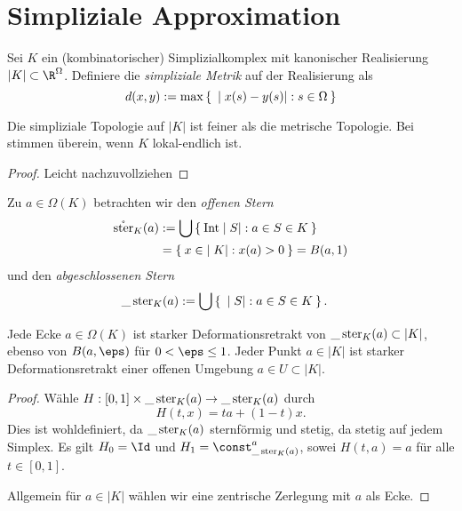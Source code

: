 \section{Simpliziale Approximation}


\begin{df}
	Sei $K$ ein (kombinatorischer) Simplizialkomplex mit kanonischer Realisierung $|K| \subset \R^{\Omega}$.
	Definiere die \emph{simpliziale Metrik} auf der Realisierung als
	\[
		d(x,y) :=
		\max \Set{ |x(s) - y(s)| : s \in \Omega }
	\]
\end{df}

\begin{st}
	Die simpliziale Topologie auf $|K|$ ist feiner als die metrische Topologie.
	Bei stimmen überein, wenn $K$ lokal-endlich ist.
	\begin{proof}
		Leicht nachzuvollziehen
	\end{proof}
\end{st}

\begin{df}
	Zu $a \in \Omega(K)$ betrachten wir den \emph{offenen Stern}
	\begin{align*}
		\mathring {\operatorname{ster}}_K(a)
		&:= \bigcup \Set{  \operatorname{Int} |S| : a \in S \in K } \\
		&= \Set{ x \in |K| : x(a) > 0 }
		= B(a, 1)
	\end{align*}
	und den \emph{abgeschlossenen Stern}
	\begin{align*}
		\_\operatorname{ster}_K(a)
		&:= \bigcup \Set{ |S| : a \in S \in K }.
	\end{align*}
\end{df}

\begin{st}
	Jede Ecke $a \in \Omega(K)$ ist starker Deformationsretrakt von $\_\operatorname{ster}_K(a) \subset |K|$, ebenso von $B(a, \eps)$ für $0 < \eps \le 1$.
	Jeder Punkt $a \in |K|$ ist starker Deformationsretrakt einer offenen Umgebung $a \in U \subset |K|$.
	\begin{proof}
		Wähle $H: [0,1] \times \_\operatorname{ster}_K(a) \to \_\operatorname{ster}_K(a)$ durch
		\[
			H(t, x) = ta + (1-t) x.
		\]
		Dies ist wohldefiniert, da $\_\operatorname{ster}_K(a)$ sternförmig und stetig, da stetig auf jedem Simplex.
		Es gilt $H_0 = \Id$ und $H_1 = \const_{\_\stern_K(a)}^a$, sowei $H(t,a) = a$ für alle $t \in [0,1]$.

		Allgemein für $a \in |K|$ wählen wir eine zentrische Zerlegung mit $a$ als Ecke.
	\end{proof}
\end{st}


